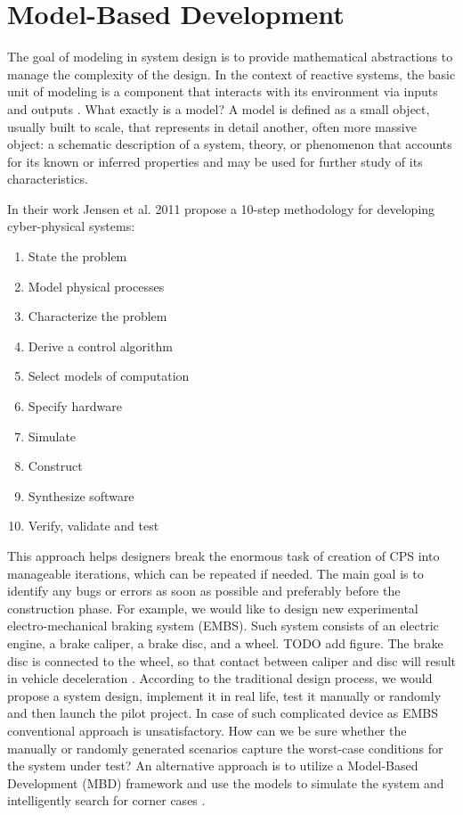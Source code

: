 \section{Model-Based Development}

The goal of modeling in system design is to provide mathematical abstractions to manage the complexity of the design. In the context of reactive systems, the basic unit of modeling is a component that interacts with its environment via inputs and outputs \cite{Rajeev:PrinciplesCPS}. What exactly is a model? A model is defined as a small object, usually built to scale, that represents in detail another, often more massive object: a schematic description of a system, theory, or phenomenon that accounts for its known or inferred properties and may be used for further study of its characteristics.

In their work Jensen et al. 2011 \cite{Lee:MBD} propose a 10-step methodology for developing cyber-physical systems:

\begin{enumerate}
    \item State the problem
    \item Model physical processes
    \item Characterize the problem
    \item Derive a control algorithm
    \item Select models of computation
    \item Specify hardware
    \item Simulate
    \item Construct
    \item Synthesize software
    \item Verify, validate and test
\end{enumerate}

This approach helps designers break the enormous task of creation of CPS into manageable iterations, which can be repeated if needed. The main goal is to identify any bugs or errors as soon as possible and preferably before the construction phase. For example, we would like to design new experimental electro-mechanical braking system (EMBS). Such system consists of an electric engine, a brake caliper, a brake disc, and a wheel. TODO add figure. The brake disc is connected to the wheel, so that contact between caliper and disc will result in vehicle deceleration \cite{Oehlerking:EMBS}. According to the traditional design process, we would propose a system design, implement it in real life, test it manually or randomly and then launch the pilot project. In case of such complicated device as EMBS conventional approach is unsatisfactory. How can we be sure whether the manually or randomly generated scenarios capture the worst-case conditions for the system under test? An alternative approach is to utilize a Model-Based Development (MBD) framework and use the models to simulate the system and intelligently search for corner cases \cite{Fainekos:testCaseGeneration}.

